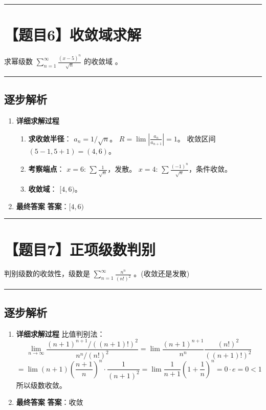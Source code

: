 \documentclass[UTF8]{ctexart}
\newenvironment{redenv}{\color{red}}{}
\newenvironment{detailedanalysis}{%
    \color{red}
    \begin{enumerate}[label=\textbf{第\arabic*步：}, leftmargin=*, align=left, itemsep=1.5ex]
}{%
    \end{enumerate}
}
\newcommand{\problemrule}{\noindent\rule{\textwidth}{1.5pt}\vspace{-0.8em}}
\newcommand{\analysisrule}{\noindent\rule{\textwidth}{0.8pt}\vspace{-0.8em}}
\newcommand{\blank}[1]{\underline{\hspace{#1}}}
\begin{document}
\problemrule
\section*{【题目6】收敛域求解}
求幂级数 $ \sum_{n=1}^{\infty} \frac{(x-5)^{n}}{\sqrt{n}} $ 的收敛域 \blank{2cm}。

\begin{redenv}
\analysisrule
\subsection*{逐步解析}

\begin{detailedanalysis}
\item \textbf{详细求解过程}
\begin{enumerate}[label=(\arabic*)]
\item \textbf{求收敛半径}：
$a_n = 1/\sqrt{n}$。
$R = \lim |\frac{a_n}{a_{n+1}}| = 1$。
收敛区间 $(5-1, 5+1) = (4, 6)$。
\item \textbf{考察端点}：
$x=6$: $\sum \frac{1}{\sqrt{n}}$，发散。
$x=4$: $\sum \frac{(-1)^n}{\sqrt{n}}$，条件收敛。
\item \textbf{收敛域}：
$[4, 6)$。
\end{enumerate}

\item \textbf{最终答案}
\textbf{答案}：$ [4, 6) $
\end{detailedanalysis}
\end{redenv}

\problemrule
\section*{【题目7】正项级数判别}
判别级数的收敛性，级数是 $ \sum_{n=1}^{\infty}\frac{n^{n}}{(n!)^{2}} $ \blank{2cm}。(收敛还是发散)

\begin{redenv}
\analysisrule
\subsection*{逐步解析}

\begin{detailedanalysis}
\item \textbf{详细求解过程}
比值判别法：
$$ \lim_{n \to \infty} \frac{(n+1)^{n+1}/((n+1)!)^2}{n^n/(n!)^2} = \lim \frac{(n+1)^{n+1}}{n^n} \frac{(n!)^2}{((n+1)!)^2} $$
$$ = \lim (n+1)(\frac{n+1}{n})^n \cdot \frac{1}{(n+1)^2} = \lim \frac{1}{n+1} (1+\frac{1}{n})^n = 0 \cdot e = 0 < 1 $$
所以级数收敛。

\item \textbf{最终答案}
\textbf{答案}：收敛
\end{detailedanalysis}
\end{redenv}
\end{document}
